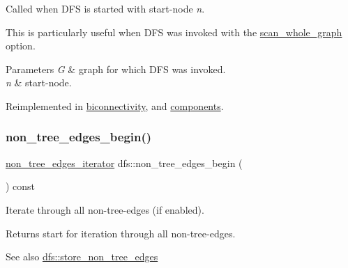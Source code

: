 Called when D\+FS is started with start-\/node {\itshape n}. 

This is particularly useful when D\+FS was invoked with the \mbox{\hyperlink{classdfs_aa7c864a6f3a120720138b187b3ed95b5}{scan\+\_\+whole\+\_\+graph}} option.


\begin{DoxyParams}{Parameters}
{\em G} & graph for which D\+FS was invoked. \\
\hline
{\em n} & start-\/node. \\
\hline
\end{DoxyParams}


Reimplemented in \mbox{\hyperlink{classbiconnectivity_a64424eec8e317b08605f8b6b952bace4}{biconnectivity}}, and \mbox{\hyperlink{classcomponents_af53365bd737b34cf63e4a6b10879ffcc}{components}}.

\mbox{\label{classdfs_a4efe5bb72d00305e6b226e67c2b2ef6e}} 
\subsubsection{\texorpdfstring{non\+\_\+tree\+\_\+edges\+\_\+begin()}{non\_tree\_edges\_begin()}}
{\footnotesize\ttfamily \mbox{\hyperlink{classdfs_ae7301f3d4417e60fb3a499180375194e}{non\+\_\+tree\+\_\+edges\+\_\+iterator}} dfs\+::non\+\_\+tree\+\_\+edges\+\_\+begin (\begin{DoxyParamCaption}{ }\end{DoxyParamCaption}) const\hspace{0.3cm}{\ttfamily [inline]}}



Iterate through all non-\/tree-\/edges (if enabled). 

\begin{DoxyReturn}{Returns}
start for iteration through all non-\/tree-\/edges. 
\end{DoxyReturn}
\begin{DoxySeeAlso}{See also}
\mbox{\hyperlink{classdfs_a6f54f1c4339eacc8961e795439d4593d}{dfs\+::store\+\_\+non\+\_\+tree\+\_\+edges}} 
\end{DoxySeeAlso}
\mbox{\label{classdfs_ad9cd92a18bda23edca8ab3ac60a15ef4}} 

